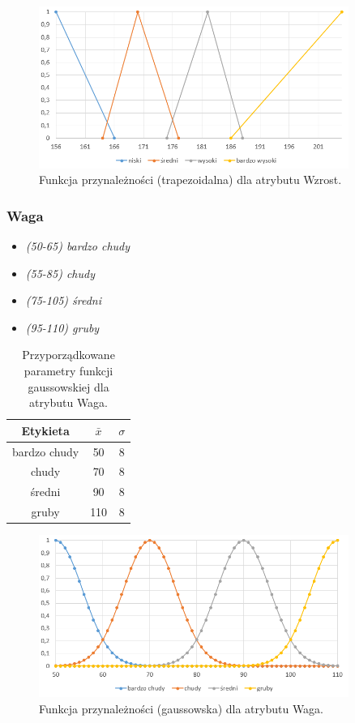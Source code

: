 \documentclass{classrep}
\begin{document}
	\begin{figure}[h!]
		\centering
		\includegraphics[width=0.9\textwidth]{zmienne/2.png}
		\caption{Funkcja przynależności (trapezoidalna) dla atrybutu Wzrost.}
		\label{wykresWzrost}
	\end{figure}

	\newpage
	\subsubsection{Waga}
	\begin{itemize}
		\item \textsl{(50-65) bardzo chudy}
		\item \textsl{(55-85) chudy}
		\item \textsl{(75-105) średni}
		\item \textsl{(95-110) gruby}
	\end{itemize}
	
	\begin{table}[h!]
		\centering
		\begin{tabular} {c c c}
			\hline
			\textbf{Etykieta} & \textbf{$\bar{x}$} & \textbf{$\sigma$} \\ [0.5ex] 
			\hline	
			\hline 
			bardzo chudy & 50 & 8  \\
			chudy & 70 & 8  \\
			średni & 90 & 8  \\
			gruby & 110 & 8  \\
			\hline
		\end{tabular}
		\caption{Przyporządkowane parametry funkcji gaussowskiej dla atrybutu  Waga. }
		\label{tabelaWaga}
	\end{table}
	
	\begin{figure}[h!]
		\centering
		\includegraphics[width=0.9\textwidth]{zmienne/3.png}
		\caption{Funkcja przynależności (gaussowska) dla atrybutu Waga.}
		\label{wykresWaga}
	\end{figure}
	
\end{document}
